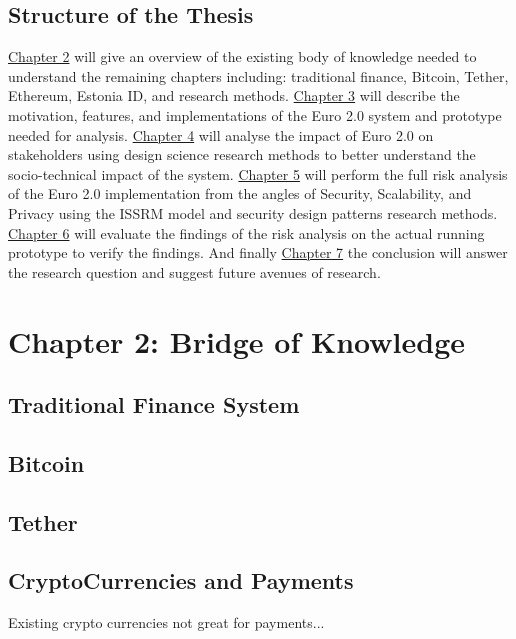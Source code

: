 \documentclass[12pt]{article} %
\begin{document}
\subsection{Structure of the Thesis} \label{ssec:1.4}

\hyperref[sec:2]{Chapter 2} will give an overview of the existing body of knowledge needed to understand the remaining chapters including: traditional finance, Bitcoin, Tether, Ethereum, Estonia ID, and research methods. \hyperref[sec:3]{Chapter 3} will describe the motivation, features, and implementations of the Euro 2.0 system and prototype needed for analysis. \hyperref[sec:4]{Chapter 4} will analyse the impact of Euro 2.0 on stakeholders using design science research methods to better understand the socio-technical impact of the system. \hyperref[sec:5]{Chapter 5} will perform the full risk analysis of the Euro 2.0 implementation from the angles of Security, Scalability, and Privacy using the ISSRM model and security design patterns research methods. \hyperref[sec:6]{Chapter 6} will evaluate the findings of the risk analysis on the actual running prototype to verify the findings. And finally \hyperref[sec:7]{Chapter 7} the conclusion will answer the research question and suggest future avenues of research.

\pagebreak

\section{Chapter 2: Bridge of Knowledge} \label{sec:2}


\subsection{Traditional Finance System}

\subsection{Bitcoin}

\subsection{Tether}

\subsection{CryptoCurrencies and Payments}
Existing crypto currencies not great for payments...
\end{document}
